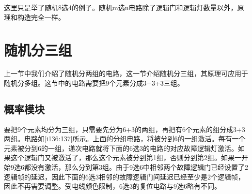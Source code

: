 \begin{figure}[!ht]
\begin{center}
\qquad
{}
\end{center}
\caption{}
\label{i134:135}
\end{figure}

这里只是举了随机8选4的例子。随机m选n电路除了逻辑门和逻辑灯数量以外，原理和构造完全一样。

\section{随机分三组}

上一节中我们介绍了随机分两组的电路，这一节介绍随机分三组，其原理可应用于随机分多组。这节中的电路需要把9个元素分成3+3+3三组。

\subsection{概率模块}

要把9个元素均分为三组，只需要先分为6+3的两组，再把有6个元素的组分成3+3两组。电路如\autoref{i136:137}所示。上面的分组电路，将被分到6的一组激活。每有一个元素被分到6的一组，递次电路就将下面的6选3的电路的对应故障逻辑灯激活。如果这个逻辑门又被激活了，那么这个元素被分到第1组，否则分到第2组。如果一开始9选6都没有激活，那么分到第3组。由于9选6中相邻两个故障逻辑门已经设置了2逻辑帧的延迟，因此下面的6选3相邻的故障逻辑门间延迟已经至少是2个逻辑帧，因此不再需要调整。受电线颜色限制，6选3的复位电路与9选6略有不同。

